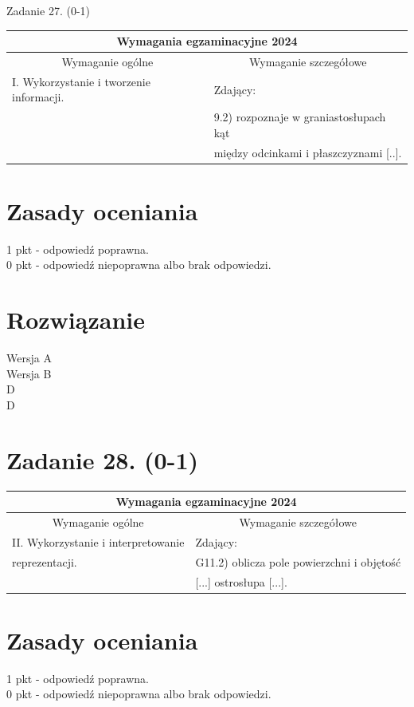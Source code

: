 \documentclass[10pt]{article}
\begin{document}
Zadanie 27. (0-1)

\begin{center}
\begin{tabular}{|l|l|}
\hline
\multicolumn{2}{|c|}{Wymagania egzaminacyjne 2024} \\
\hline
\multicolumn{1}{|c|}{Wymaganie ogólne} & \multicolumn{1}{c|}{Wymaganie szczegółowe} \\
\hline
I. Wykorzystanie i tworzenie informacji. & Zdający: \\
 & 9.2) rozpoznaje w graniastosłupach kąt \\
 & między odcinkami i płaszczyznami [..]. \\
\hline
\end{tabular}
\end{center}

\section*{Zasady oceniania}
1 pkt - odpowiedź poprawna.\\
0 pkt - odpowiedź niepoprawna albo brak odpowiedzi.

\section*{Rozwiązanie}
Wersja A\\
Wersja B\\
D\\
D

\section*{Zadanie 28. (0-1)}
\begin{center}
\begin{tabular}{|l|l|}
\hline
\multicolumn{2}{|c|}{Wymagania egzaminacyjne 2024} \\
\hline
\multicolumn{1}{|c|}{Wymaganie ogólne} & \multicolumn{1}{c|}{Wymaganie szczegółowe} \\
\hline
II. Wykorzystanie i interpretowanie & Zdający: \\
reprezentacji. & G11.2) oblicza pole powierzchni i objętość \\
 & [...] ostrosłupa [...]. \\
\hline
\end{tabular}
\end{center}

\section*{Zasady oceniania}
1 pkt - odpowiedź poprawna.\\
0 pkt - odpowiedź niepoprawna albo brak odpowiedzi.
\end{document}
